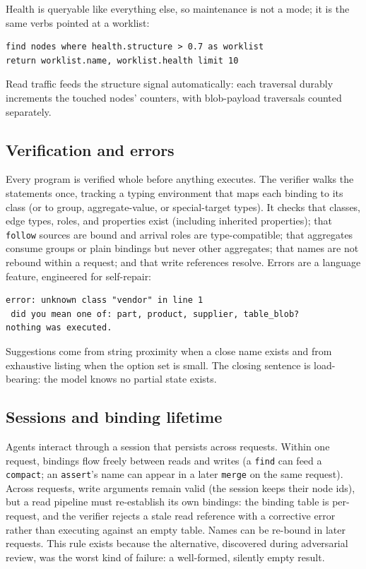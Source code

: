 \documentclass[11pt]{article}
\begin{document}
Health is queryable like everything else, so maintenance is not a mode; it is the same verbs pointed at a worklist:

\begin{lstlisting}[style=gl]
find nodes where health.structure > 0.7 as worklist
return worklist.name, worklist.health limit 10
\end{lstlisting}

Read traffic feeds the structure signal automatically: each traversal durably increments the touched nodes' counters, with blob-payload traversals counted separately.

\subsection{Verification and errors}\label{sec:verify}

Every program is verified whole before anything executes. The verifier walks the statements once, tracking a typing environment that maps each binding to its class (or to group, aggregate-value, or special-target types). It checks that classes, edge types, roles, and properties exist (including inherited properties); that \texttt{follow} sources are bound and arrival roles are type-compatible; that aggregates consume groups or plain bindings but never other aggregates; that names are not rebound within a request; and that write references resolve. Errors are a language feature, engineered for self-repair:

\begin{lstlisting}[style=err]
error: unknown class "vendor" in line 1
 did you mean one of: part, product, supplier, table_blob?
nothing was executed.
\end{lstlisting}

Suggestions come from string proximity when a close name exists and from exhaustive listing when the option set is small. The closing sentence is load-bearing: the model knows no partial state exists.

\subsection{Sessions and binding lifetime}

Agents interact through a session that persists across requests. Within one request, bindings flow freely between reads and writes (a \texttt{find} can feed a \texttt{compact}; an \texttt{assert}'s name can appear in a later \texttt{merge} on the same request). Across requests, write arguments remain valid (the session keeps their node ids), but a read pipeline must re-establish its own bindings: the binding table is per-request, and the verifier rejects a stale read reference with a corrective error rather than executing against an empty table. Names can be re-bound in later requests. This rule exists because the alternative, discovered during adversarial review, was the worst kind of failure: a well-formed, silently empty result.
\end{document}
